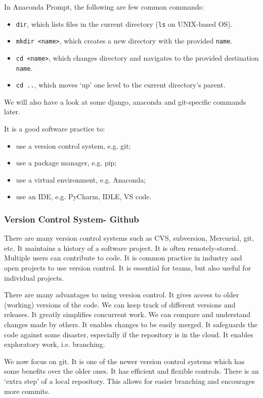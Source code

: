\documentclass[a4paper, openany]{memoir}
\begin{document}
    In Anaconda Prompt, the following are few common commands:
    \begin{itemize}
        \item \texttt{dir}, which lists files in the current directory (\texttt{ls} on UNIX-based OS).
        \item \texttt{mkdir <name>}, which creates a new directory with the provided \texttt{name}.
        \item \texttt{cd <name>}, which changes directory and navigates to the provided destination \texttt{name}.
        \item \texttt{cd ..}, which moves `up' one level to the current directory's parent.
    \end{itemize}
    We will also have a look at some django, anaconda and git-specific commands later.

    It is a good software practice to:
    \begin{itemize}
        \item use a version control system, e.g. git;
        \item use a package manager, e.g. pip;
        \item use a virtual environment, e.g. Anaconda;
        \item use an IDE, e.g. PyCharm, IDLE, VS code.
    \end{itemize}

    \subsubsection{Version Control System- Github}
    There are many version control systems such as CVS, subversion, Mercurial, git, etc. It maintains a history of a software project. It is often remotely-stored. Multiple users can contribute to code. It is common practice in industry and open projects to use version control. It is essential for teams, but also useful for individual projects.

    There are many advantages to using version control. It gives access to older (working) versions of the code. We can keep track of different versions and releases. It greatly simplifies concurrent work. We can compare and understand changes made by others. It enables changes to be easily merged. It safeguards the code against some disaster, especially if the repository is in the cloud. It enables exploratory work, i.e. branching.

    We now focus on git. It is one of the newer version control systems which has some benefits over the older ones. It has efficient and flexible controls. There is an `extra step' of a local repository. This allows for easier branching and encourages more commits.
\end{document}
